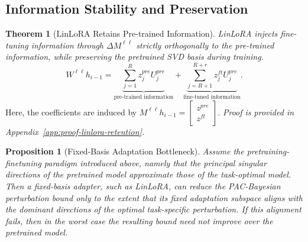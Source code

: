 \subsection{Information Stability and Preservation}

\noindent \textbf{Theorem 1} (LinLoRA Retains Pre-trained Information).
\textit{
LinLoRA injects fine-tuning information through $\Delta M^{\ell \ell}$
strictly orthogonally to the pre-trained information, while preserving the
pretrained SVD basis during training.
}
\[
W^{\ell \ell}h_{i-1}
=
\underbrace{\sum\limits_{j=1}^{R} z^{pre}_j U^{pre}_j}_{\text{pre-trained information}}
+
\underbrace{\sum\limits_{j=R+1}^{R+r} z^{ft}_j U^{pre}_j}_{\text{fine-tuned information}} .
\]
Here, the coefficients are induced by $M^{\ell \ell}h_{i-1}
=
\begin{bmatrix}
z^{pre} \\
z^{ft}
\end{bmatrix}
$. \textit{Proof is provided in Appendix~\ref{app:proof-linlora-retention}.}

\noindent \textbf{Proposition 1} (Fixed-Basis Adaptation Bottleneck). \textit {Assume the pretraining-finetuning paradigm introduced above, namely that the principal singular directions of the pretrained model approximate those of the task-optimal model. Then a fixed-basis adapter, such as LinLoRA, can reduce the PAC-Bayesian perturbation bound only to the extent that its fixed adaptation subspace aligns with the dominant directions of the optimal task-specific perturbation. If this alignment fails, then in the worst case the resulting bound need not improve over the pretrained model.}

